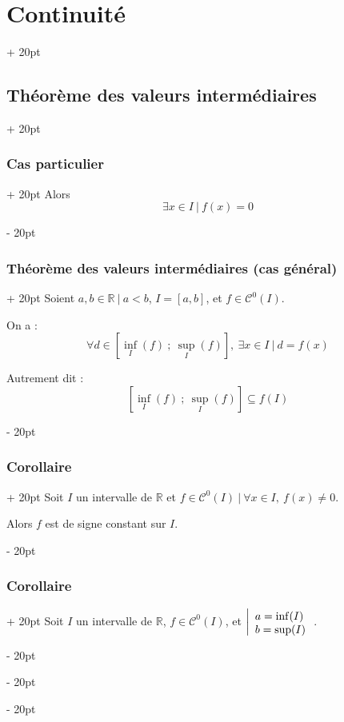 \documentclass[a4paper, 12pt, twoside]{article}
\newcommand{\R}{\mathbb{R}} %
\newcommand{\seg}[2]{\left[ #1\ ;\ #2 \right]}
\newcommand{\ind}[1][20pt]{\advance\leftskip + #1}
\newcommand{\deind}[1][20pt]{\advance\leftskip - #1}
\newenvironment{indt}[2][20pt]{#2 \par \ind[#1]}{\par \deind} %
\begin{document}
\begin{indt}{\section{Continuité}}
\begin{indt}{\subsection{Théorème des valeurs intermédiaires}}
\begin{indt}{\subsubsection{Cas particulier}}
                Alors
                \[
                    \exists x \in I\ |\ f(x) = 0
                \]
            \end{indt}

            \vspace{12pt}
            
            \begin{indt}{\subsubsection{Théorème des valeurs intermédiaires (cas général)}}
                Soient $a, b \in \R\ |\ a < b$, $I = [a, b]$, et $f \in \mathcal C^0(I)$.

                On a :
                \[
                    \forall d \in \seg{\inf_I(f)}{\sup_I(f)},\
                    \exists x \in I\ |\
                    d = f(x)
                \]

                Autrement dit :
                \[
                    \seg{\inf_I(f)}{\sup_I(f)} \subseteq f(I)
                \]
            \end{indt}

            \vspace{12pt}
            
            \begin{indt}{\subsubsection{Corollaire}}
                Soit $I$ un intervalle de $\R$ et $f \in \mathcal C^0(I)\ |\ \forall x \in I,\ f(x) \neq 0$.

                Alors $f$ est de signe constant sur $I$.
            \end{indt}

            \vspace{12pt}
            
            \begin{indt}{\subsubsection{Corollaire}}
                Soit $I$ un intervalle de $\R$, $f \in \mathcal C^0(I)$, et
                $
                    \left|
                    \begin{array}{l}
                        \displaystyle a = \inf(I)
                        \\
                        \displaystyle b = \sup(I)
                        \vspace{-3pt}
                    \end{array}
                    \right.
                $.


\end{indt}
\end{indt}
\end{indt}
\end{document}
